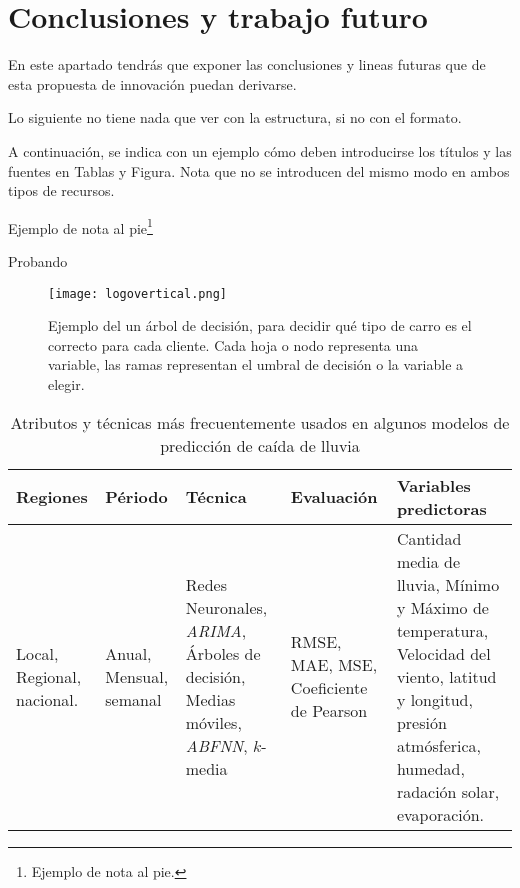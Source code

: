 \documentclass[12pt,a4paper]{articuloAPA}
\begin{document}
\section{Conclusiones y trabajo futuro}

En este apartado tendrás que exponer las conclusiones y lineas futuras que de esta propuesta de innovación puedan derivarse.

Lo siguiente no tiene nada que ver con la estructura, si no con el formato. 

A continuación, se indica con un ejemplo cómo deben introducirse los títulos y las fuentes en Tablas y Figura. Nota que no se introducen del mismo modo en ambos tipos de recursos.

Ejemplo de nota al pie\footnote[1]{Ejemplo de nota al pie.}

Probando 


\begin{figure}
  \label{fig:logovertical}
  \centering
  \caption[Proceso de percepción de objetos.]{Ejemplo del un árbol de decisión, para decidir qué tipo de carro es el correcto para cada cliente. Cada hoja o nodo representa una variable, las ramas representan el umbral de decisión o la variable a elegir.}
  \texttt{[image: logovertical.png]}
\end{figure}

\begin{table}
  \label{tab:atributos}
  \caption{Atributos y técnicas más frecuentemente usados en algunos modelos de predicción de caída de lluvia}
  \centering
  \begin{tabular}{p{0.2\tablelength}p{0.2\tablelength}p{0.4\tablelength}p{0.4\tablelength}p{0.8\tablelength}}
    \toprule
    Regiones & Périodo & Técnica & Evaluación & Variables predictoras \\
    \midrule
    Local, Regional, nacional. 
    & Anual, Mensual, semanal 
    & Redes Neuronales, \textit{ARIMA}, Árboles de decisión, Medias móviles, \textit{ABFNN}, $k$-media
    & RMSE, MAE, MSE, Coeficiente de Pearson 
    & Cantidad media de lluvia, Mínimo y Máximo de temperatura, Velocidad del viento, latitud y longitud, presión atmósferica, humedad, radación solar, evaporación.\\	  
    \bottomrule
  \end{tabular}
\end{table}
\end{document}
